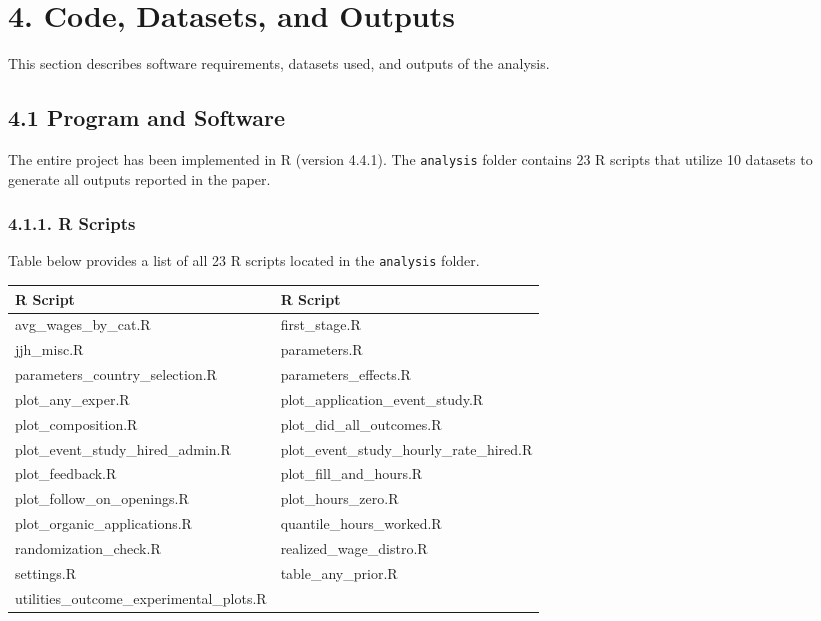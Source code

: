 \documentclass[10pt]{article}
\newenvironment{eightpt}{\begingroup\fontsize{8}{13}\selectfont}{\endgroup}
\begin{document}
\vspace{1em}
\section*{4. Code, Datasets, and Outputs}

This section describes software requirements, datasets used, and outputs of the analysis.

\subsection*{4.1 Program and Software}

The entire project has been implemented in R (version 4.4.1). The \texttt{analysis} folder contains 23 R scripts that utilize 10 datasets to generate all outputs reported in the paper. 

\subsubsection*{4.1.1. R Scripts}

Table below provides a list of all 23 R scripts located in the \texttt{analysis} folder.

\begin{eightpt}
\begin{tabularx}{\textwidth}{TT}
\toprule
R Script & R Script \\
\midrule
avg\_wages\_by\_cat.R & first\_stage.R \\
jjh\_misc.R & parameters.R \\
parameters\_country\_selection.R & parameters\_effects.R \\
plot\_any\_exper.R & plot\_application\_event\_study.R \\
plot\_composition.R & plot\_did\_all\_outcomes.R \\
plot\_event\_study\_hired\_admin.R & plot\_event\_study\_hourly\_rate\_hired.R \\
plot\_feedback.R & plot\_fill\_and\_hours.R \\
plot\_follow\_on\_openings.R & plot\_hours\_zero.R \\
plot\_organic\_applications.R & quantile\_hours\_worked.R \\
randomization\_check.R & realized\_wage\_distro.R \\
settings.R & table\_any\_prior.R \\
utilities\_outcome\_experimental\_plots.R & \\
\bottomrule
\end{tabularx}
\end{eightpt}
\end{document}
